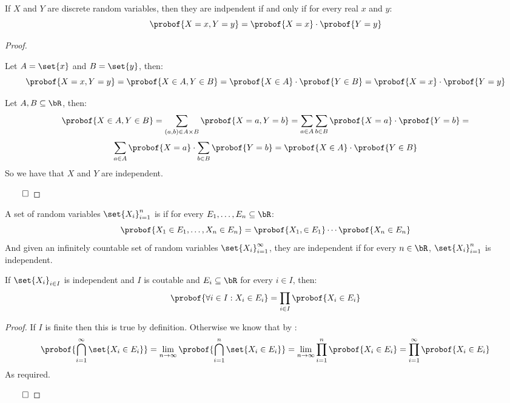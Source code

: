 \begin{prop*}

	If $X$ and $Y$ are discrete random variables, then they are indpendent if and only if for every real $x$ and $y$:
	\[ \probof{X=x,Y=y}=\probof{X=x}\cdot\probof{Y=y} \]

\end{prop*}

\begin{proof}

	\begin{multiparitemize}[0pt]
		\paritem{$(\implies)$} Let $A=\set{x}$ and $B=\set{y}$, then:
			\[ \probof{X=x, Y=y} = \probof{X\in A, Y\in B} = \probof{X\in A}\cdot\probof{Y\in B} = \probof{X=x}\cdot\probof{Y=y} \]

		\paritem{$(\impliedby)$} Let $A, B\subseteq\bR$, then:
			\[ \probof{X\in A, Y\in B} = \sum_{(a,b)\in A\times B}\probof{X=a, Y=b} = \sum_{a\in A}\sum_{b\in B}\probof{X=a}\cdot\probof{Y=b} = \]
			\[ \sum_{a\in A}\probof{X=a} \cdot \sum_{b\in B}\probof{Y=b} = \probof{X\in A}\cdot\probof{Y\in B} \]
			So we have that $X$ and $Y$ are independent.
	\end{multiparitemize}

	\hfill$\qed$

\end{proof}

\begin{defn*}

	A set of random variables $\set{X_i}_{i=1}^n$ is  if for every $E_1,\dots,E_n\subseteq\bR$:
	\[ \probof{X_1\in E_1,\dots,X_n\in E_n} = \probof{X_1,\in E_1}\cdots\probof{X_n\in E_n} \]
	And given an infinitely countable set of random variables $\set{X_i}_{i=1}^\infty$, they are independent if for every $n\in\bR$,
	$\set{X_i}_{i=1}^n$ is independent.

\end{defn*}

\begin{prop*}

	If $\set{X_i}_{i\in I}$ is independent and $I$ is coutable and $E_i\subseteq\bR$ for every $i\in I$, then:
	\[ \probof{\forall i\in I: X_i\in E_i} = \prod_{i\in I}\probof{X_i\in E_i} \]

\end{prop*}

\begin{proof}

	If $I$ is finite then this is true by definition.
	Otherwise we know that by :
	\[ \probof{\bigcap_{i=1}^\infty\set{X_i\in E_i}} = \lim_{n\to\infty}\probof{\bigcap_{i=1}^n\set{X_i\in E_i}} =
	\lim_{n\to\infty}\prod_{i=1}^n\probof{X_i\in E_i} = \prod_{i=1}^\infty\probof{X_i\in E_i} \]
	As required.

	\hfill$\qed$

\end{proof}

